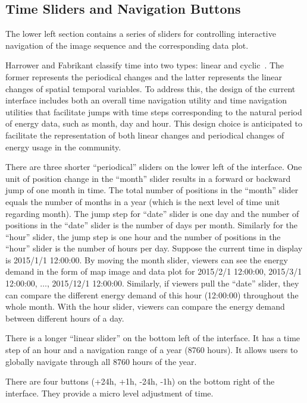 \subsection{Time Sliders and Navigation Buttons}
The lower left section contains a series of sliders for controlling
interactive navigation of the image sequence and the corresponding
data plot.

Harrower and Fabrikant classify time into two types: linear and
cyclic~\cite{Harrower2008}. The former represents the periodical
changes and the latter represents the linear changes of spatial
temporal variables. To address this, the design of the current
interface includes both an overall time navigation utility and time
navigation utilities that facilitate jumps with time steps
corresponding to the natural period of energy data, such as month, day
and hour. This design choice is anticipated to facilitate the
representation of both linear changes and periodical changes of energy
usage in the community.

There are three shorter ``periodical'' sliders on the lower left of
the interface. One unit of position change in the ``month'' slider
results in a forward or backward jump of one month in time. The total
number of positions in the ``month'' slider equals the number of
months in a year (which is the next level of time unit regarding
month).  The jump step for ``date'' slider is one day and the number
of positions in the ``date'' slider is the number of days per
month. Similarly for the ``hour'' slider, the jump step is one hour
and the number of positions in the ``hour'' slider is the number of
hours per day. Suppose the current time in display is 2015/1/1
12:00:00. By moving the month slider, viewers can see the energy
demand in the form of map image and data plot for 2015/2/1 12:00:00,
2015/3/1 12:00:00, $\dots$, 2015/12/1 12:00:00. Similarly, if viewers
pull the ``date'' slider, they can compare the different energy demand
of this hour (12:00:00) throughout the whole month. With the hour
slider, viewers can compare the energy demand between different hours
of a day.

There is a longer ``linear slider'' on the bottom left of the
interface. It has a time step of an hour and a navigation range of a
year (8760 hours). It allows users to globally navigate through all
8760 hours of the year.

There are four buttons (+24h, +1h, -24h, -1h) on the bottom right of
the interface. They provide a micro level adjustment of time.

